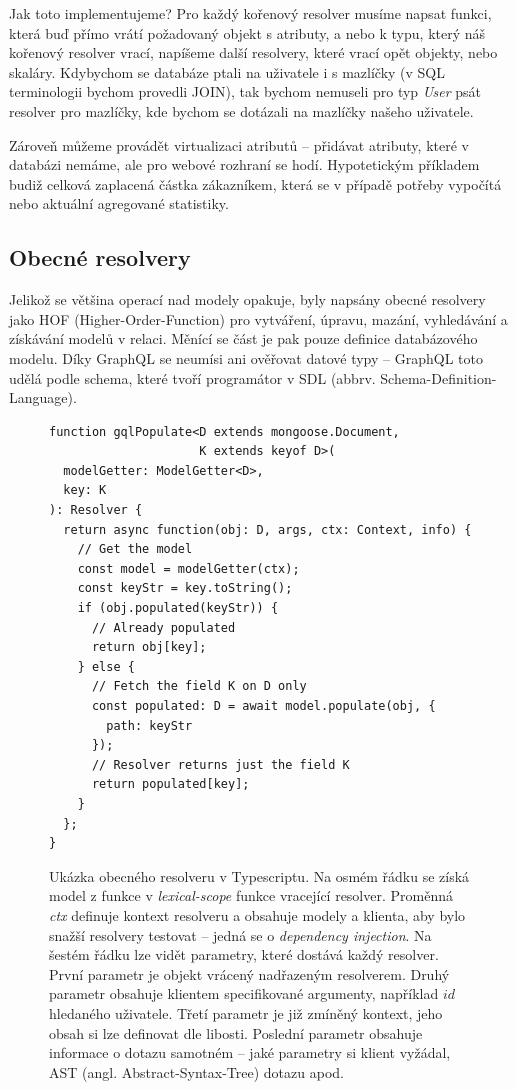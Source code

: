 Jak toto implementujeme? Pro každý kořenový resolver musíme napsat funkci, která buď přímo vrátí požadovaný objekt s atributy, a nebo
k typu, který náš kořenový resolver vrací, napíšeme další resolvery, které vrací opět objekty, nebo skaláry.
Kdybychom se databáze ptali na uživatele i s
mazlíčky (v SQL terminologii bychom provedli JOIN), tak bychom nemuseli pro typ \textit{User} psát resolver pro mazlíčky, kde bychom
se dotázali na mazlíčky našeho uživatele.
\citep[viz][]{GraphQLDoc}

Zároveň můžeme provádět virtualizaci atributů -- přidávat atributy, které v databázi nemáme, ale pro webové rozhraní se hodí.
Hypotetickým příkladem budiž celková zaplacená částka zákazníkem, která se v případě potřeby vypočítá nebo aktuální agregované statistiky.
\subsection{Obecné resolvery}

\noindent
Jelikož se většina operací nad modely opakuje, byly napsány obecné resolvery jako HOF (Higher-Order-Function)
pro vytváření, úpravu, mazání, vyhledávání a získávání modelů v relaci.
Měnící se část je pak pouze definice databázového modelu. Díky GraphQL se neumísi ani ověřovat datové typy --
GraphQL toto udělá podle schema, které tvoří programátor v SDL (abbrv. Schema-Definition-Language).

\begin{figure}[!htb]
\lstset{language=Javascript}
\begin{lstlisting}
function gqlPopulate<D extends mongoose.Document,
                     K extends keyof D>(
  modelGetter: ModelGetter<D>,
  key: K
): Resolver {
  return async function(obj: D, args, ctx: Context, info) {
    // Get the model
    const model = modelGetter(ctx);
    const keyStr = key.toString();
    if (obj.populated(keyStr)) {
      // Already populated
      return obj[key];
    } else {
      // Fetch the field K on D only
      const populated: D = await model.populate(obj, {
        path: keyStr
      });
      // Resolver returns just the field K
      return populated[key];
    }
  };
}
\end{lstlisting}
\caption[Ukázka obecného resolveru v Typescriptu.]{Ukázka obecného resolveru v Typescriptu. Na osmém řádku se získá model z funkce v \textit{lexical-scope} funkce vracející resolver. Proměnná \textit{ctx} definuje kontext resolveru a obsahuje modely a klienta, aby bylo snažší resolvery testovat -- jedná se o \textit{dependency injection}. Na šestém řádku lze vidět parametry, které dostává každý resolver. První parametr je objekt vrácený nadřazeným resolverem. Druhý parametr obsahuje klientem specifikované argumenty, například $id$ hledaného uživatele. Třetí parametr je již zmíněný kontext, jeho obsah si lze definovat dle libosti. Poslední parametr obsahuje informace o dotazu samotném -- jaké parametry si klient vyžádal, AST (angl. Abstract-Syntax-Tree) dotazu apod.}
\label{fig:generic_resolver}
\end{figure}

